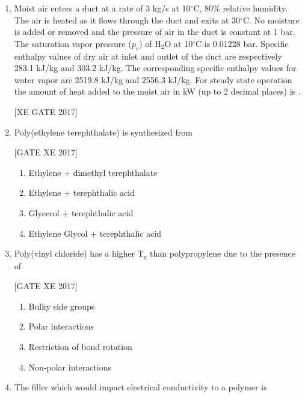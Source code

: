 \documentclass[journal,12pt,onecolumn]{IEEEtran}
\theoremstyle{remark}
\begin{document}
\begin{enumerate}
\hfill [XE GATE 2017]


\item Moist air enters a duct at a rate of 3 kg/s at 10$^\circ$C, 80\% relative humidity. The air is heated as it flows through the duct and exits at 30$^\circ$C. No moisture is added or removed and the pressure of air in the duct is constant at 1 bar. The saturation vapor pressure ($p_v$) of H$_2$O at 10$^\circ$C is 0.01228 bar. Specific enthalpy values of dry air at inlet and outlet of the duct are respectively 283.1 kJ/kg and 303.2 kJ/kg. The corresponding specific enthalpy values for water vapor are 2519.8 kJ/kg and 2556.3 kJ/kg. For steady state operation the amount of heat added to the moist air in kW (up to 2 decimal places) is \underline{\hspace{2cm}}.  

\hfill [XE GATE 2017]
\item Poly(ethylene terephthalate) is synthesized from  

\hfill [GATE XE 2017]  

\begin{multicols}{2}  
\begin{enumerate}  
\item Ethylene + dimethyl terephthalate  
\item Ethylene + terephthalic acid  
\item Glycerol + terephthalic acid  
\item Ethylene Glycol + terephthalic acid  
\end{enumerate}  
\end{multicols}  

\item Poly(vinyl chloride) has a higher T$_g$ than polypropylene due to the presence of  

\hfill [GATE XE 2017]  

\begin{multicols}{2}  
\begin{enumerate}  
\item Bulky side groups  
\item Polar interactions  
\item Restriction of bond rotation  
\item Non-polar interactions  
\end{enumerate}  
\end{multicols}  

\item The filler which would impart electrical conductivity to a polymer is  


\end{enumerate}
\end{document}
